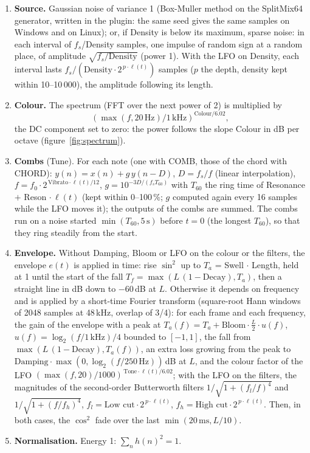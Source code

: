 \documentclass[a4paper,11pt]{article}
\newcommand{\dB}{\,dB}
\begin{document}
\begin{enumerate}
\item \textbf{Source.} Gaussian noise of variance 1 (Box-Muller method on the SplitMix64 generator,
  written in the plugin: the same seed gives the same samples on Windows and on Linux); or, if
  Density is below its maximum, sparse noise: in each interval of $f_s$/Density samples, one
  impulse of random sign at a random place, of amplitude $\sqrt{f_s/\text{Density}}$ (power 1).
  With the LFO on Density, each interval lasts $f_s / (\text{Density} \cdot 2^{\,p \cdot \ell(t)})$
  samples ($p$ the depth, density kept within 10--10\,000), the amplitude following its length.
\item \textbf{Colour.} The spectrum (FFT over the next power of 2) is multiplied by
  \[ \left(\max(f, 20\,\text{Hz}) / 1\,\text{kHz}\right)^{\text{Colour}/6.02}, \]
  the DC component set to zero: the power follows the slope Colour in dB per octave
  (figure~\ref{fig:spectrum}).
\item \textbf{Combs} (Tune). For each note (one with COMB, those of the chord with CHORD):
  $y(n) = x(n) + g\, y(n - D)$, $D = f_s / f$ (linear interpolation), $f = f_0 \cdot 2^{\,\text{Vibrato}
  \cdot \ell(t)/12}$, $g = 10^{-3 D / (f_s T_{60})}$ with $T_{60}$ the ring time of Resonance $+$
  Reson $\cdot\, \ell(t)$ (kept within 0--100\,\%; $g$ computed again every 16 samples while the LFO
  moves it); the outputs of the combs are summed. The combs run on a noise started $\min(T_{60},
  5\,\text{s})$ before $t = 0$ (the longest $T_{60}$), so that they ring steadily from the start.
\item \textbf{Envelope.} Without Damping, Bloom or LFO on the colour or the filters, the envelope $e(t)$ is applied in time:
  rise $\sin^2$ up to $T_a$ = Swell $\cdot$ Length, held at 1 until the start of the fall
  $T_f = \max(L\,(1 - \text{Decay}), T_a)$, then a straight line in dB down to $-60$\dB{} at $L$.
  Otherwise it depends on frequency and is applied by a short-time Fourier transform (square-root
  Hann windows of 2048 samples at 48\,kHz, overlap of 3/4): for each frame and each frequency, the
  gain of the envelope with a peak at $T_a(f) = T_a + \text{Bloom} \cdot \frac{L}{2} \cdot u(f)$,
  $u(f) = \log_2(f / 1\,\text{kHz})/4$ bounded to $[-1, 1]$, the fall from $\max(L\,(1 -
  \text{Decay}), T_a(f))$, an extra loss growing from the peak to $\text{Damping} \cdot \max(0,
  \log_2(f / 250\,\text{Hz}))$\dB{} at $L$, and the colour factor of the LFO
  $(\max(f, 20) / 1000)^{\,\text{Tone} \cdot \ell(t)/6.02}$; with the LFO on the filters, the
  magnitudes of the second-order Butterworth filters $1/\sqrt{1 + (f_l/f)^4}$ and
  $1/\sqrt{1 + (f/f_h)^4}$, $f_l = \text{Low cut} \cdot 2^{\,p \cdot \ell(t)}$,
  $f_h = \text{High cut} \cdot 2^{\,p \cdot \ell(t)}$. Then, in both cases, the $\cos^2$ fade over the last $\min(20\,\text{ms}, L/10)$.
\item \textbf{Normalisation.} Energy 1: $\sum_n h(n)^2 = 1$.
\end{enumerate}
\end{document}
